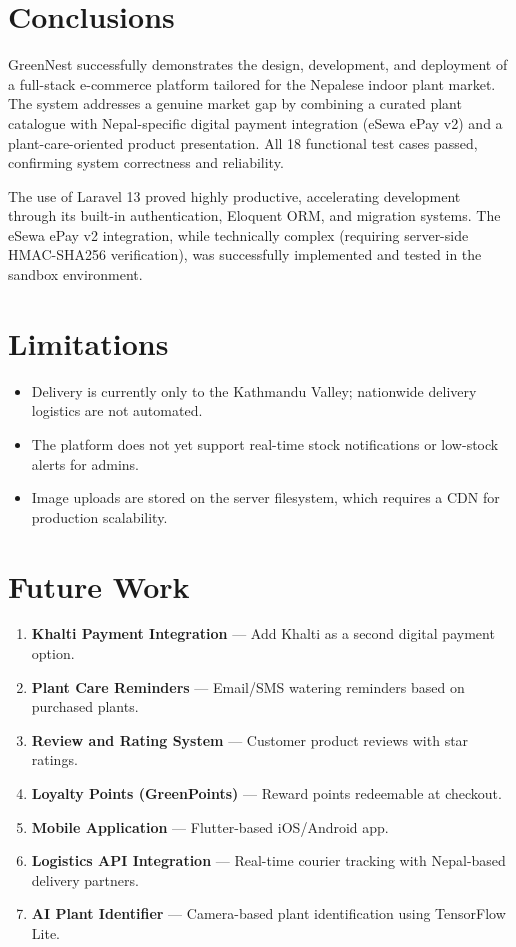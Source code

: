 \documentclass[12pt,a4paper]{report}
\begin{document}
\section{Conclusions}

GreenNest successfully demonstrates the design, development, and deployment of a full-stack e-commerce platform tailored for the Nepalese indoor plant market. The system addresses a genuine market gap by combining a curated plant catalogue with Nepal-specific digital payment integration (eSewa ePay v2) and a plant-care-oriented product presentation. All 18 functional test cases passed, confirming system correctness and reliability.

The use of Laravel 13 proved highly productive, accelerating development through its built-in authentication, Eloquent ORM, and migration systems. The eSewa ePay v2 integration, while technically complex (requiring server-side HMAC-SHA256 verification), was successfully implemented and tested in the sandbox environment.

\section{Limitations}

\begin{itemize}
  \item Delivery is currently only to the Kathmandu Valley; nationwide delivery logistics are not automated.
  \item The platform does not yet support real-time stock notifications or low-stock alerts for admins.
  \item Image uploads are stored on the server filesystem, which requires a CDN for production scalability.
\end{itemize}

\section{Future Work}

\begin{enumerate}
  \item \textbf{Khalti Payment Integration} — Add Khalti as a second digital payment option.
  \item \textbf{Plant Care Reminders} — Email/SMS watering reminders based on purchased plants.
  \item \textbf{Review and Rating System} — Customer product reviews with star ratings.
  \item \textbf{Loyalty Points (GreenPoints)} — Reward points redeemable at checkout.
  \item \textbf{Mobile Application} — Flutter-based iOS/Android app.
  \item \textbf{Logistics API Integration} — Real-time courier tracking with Nepal-based delivery partners.
  \item \textbf{AI Plant Identifier} — Camera-based plant identification using TensorFlow Lite.
\end{enumerate}
\end{document}
